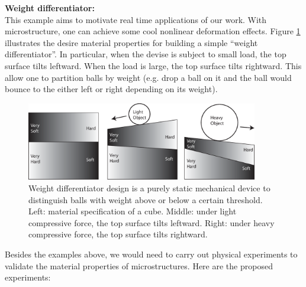 \begin{description}
\item{\bf Weight differentiator:}\\
This example aims to motivate real time applications of our work.  With
microstructure, one can achieve some cool nonlinear deformation effects. Figure
\ref{fig:weight_differentiator} illustrates the desire material properties for
building a simple ``weight differentiator''.  In particular, when the devise is
subject to small load, the top surface tilts leftward.  When the load is large,
the top surface tilts rightward.  This allow one to partition balls by weight
(e.g. drop a ball on it and the ball would bounce to the either left or right
depending on its weight).

\begin{figure}
\centering
\includegraphics[width=0.9\textwidth]{images/weight_differentiator}
\caption{
Weight differentiator design is a purely static mechanical device to distinguish balls
with weight above or below a certain threshold.
Left: material specification of a cube.  Middle: under light
compressive force, the top surface tilts leftward.  Right: under heavy
compressive force, the top surface tilts rightward.}
\label{fig:weight_differentiator}
\end{figure}

\end{description}

Besides the examples above, we would need to carry out physical experiments to
validate the material properties of microstructures.  Here are the proposed
experiments:

